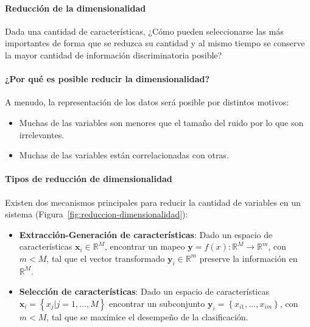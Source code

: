 \documentclass{article}
\begin{document}
\paragraph{Reducción de la dimensionalidad}
\label{par:reduccion_de_la_dimensionalidad}
Dada una cantidad de características, ¿Cómo pueden seleccionarse las más importantes de forma que se reduzca su cantidad y al mismo tiempo se conserve la mayor cantidad de información discriminatoria posible?

\paragraph{¿Por qué es posible reducir la dimensionalidad?} 
\label{par:por_que_es_posible_reducir_la_dimensionalidad}
A menudo, la representación de los datos será posible por distintos motivos:
\begin{itemize}
	\item Muchas de las variables son menores que el tamaño del ruido por lo que son irrelevantes.
	\item Muchas de las variables están correlacionadas con otras.
\end{itemize}

\paragraph{Tipos de reducción de dimensionalidad}
\label{par:tipos_de_reduccion_de_dimensionalidad}
Existen dos mecanismos principales para reducir la cantidad de variables en un sistema (Figura~\ref{fig:reduccion-dimensionalidad}):
\begin{itemize}
	\item \textbf{Extracción-Generación de características}: Dado un espacio de características $\mathbf{x}_i \in \mathbb{R} ^M$, encontrar un mapeo $\mathbf{y} = f(x):\mathbb{R}^M \to \mathbb{R}^m$, con $m<M$, tal que el vector transformado $\mathbf{y}_i \in \mathbb{R}^m$ preserve la información en $\mathbb{R}^M$.
	\item \textbf{Selección de características}: Dado un espacio de características $\mathbf{x}_i = \left \{ x_j | j = 1, \ldots, M  \right \}$ encontrar un subconjunto $\mathbf{y}_i=\left \{x_{i1},\ldots,x_{im} \right \}$, con $m<M$, tal que se maximice el desempeño de la clasificación.
\end{itemize}
\end{document}
